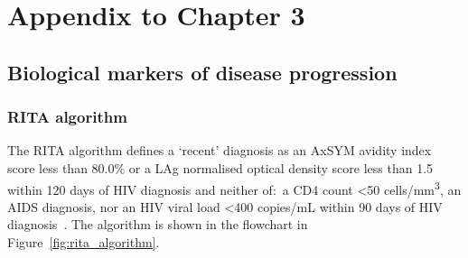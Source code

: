 
\chapter{Appendix to Chapter 3}\label{appx:hivbackcalc}

\graphicspath{{02_HIVBackCalc/Figs/}}

\section{Biological markers of disease progression}\label{appendix:biomarkers}

\subsection{RITA algorithm}

The RITA algorithm defines a `recent' diagnosis as an AxSYM avidity index score less than 80.0\% or a LAg normalised optical density score less than 1.5 within 120 days of HIV diagnosis and neither of:\ a CD4 count <50 cells/mm\textsuperscript{3}, an AIDS diagnosis, nor an HIV viral load <400 copies/mL within 90 days of HIV diagnosis~\parencite{Aghaizu2014-hl}. The algorithm is shown in the flowchart in Figure~\ref{fig:rita_algorithm}.


